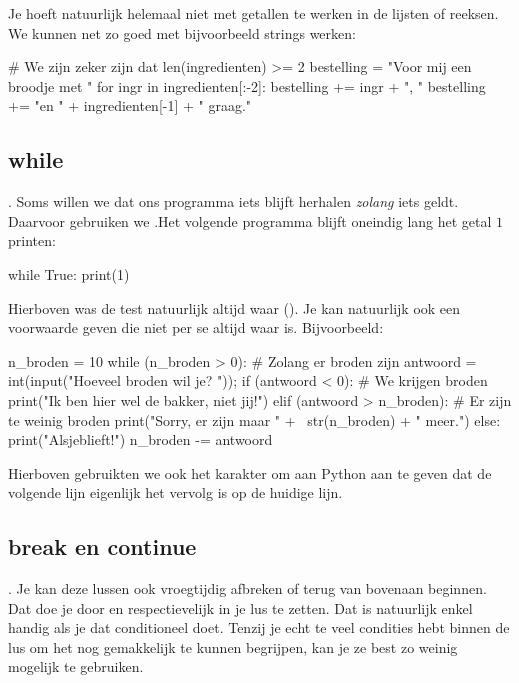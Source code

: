   Je hoeft natuurlijk helemaal niet met getallen te werken in de lijsten of
  reeksen. We kunnen net zo goed met bijvoorbeeld strings werken:
  \begin{python}
    # We zijn zeker zijn dat len(ingredienten) >= 2
    bestelling = "Voor mij een broodje met "
    for ingr in ingredienten[:-2]:
      bestelling += ingr + ", "
    bestelling += "en " + ingredienten[-1] + " graag."
  \end{python}

  \subsection{while}. Soms willen we dat ons programma iets blijft herhalen
  \emph{zolang} iets geldt. Daarvoor gebruiken we .Het volgende
  programma blijft oneindig lang het getal $1$ printen:
  \begin{python}
    while True:
      print(1)
  \end{python}
  Hierboven was de test natuurlijk altijd waar (). Je kan natuurlijk
  ook een voorwaarde geven die niet per se altijd waar is. Bijvoorbeeld:
  \begin{python}
    n_broden = 10
    while (n_broden > 0):         # Zolang er broden zijn
      antwoord = int(input("Hoeveel broden wil je? "));
      if (antwoord < 0):          # We krijgen broden
        print("Ik ben hier wel de bakker, niet jij!")
      elif (antwoord > n_broden): # Er zijn te weinig broden
        print("Sorry, er zijn maar " + \
          str(n_broden) + " meer.")
      else:
        print("Alsjeblieft!")
        n_broden -= antwoord
  \end{python}
  Hierboven gebruikten we ook het karakter \py{\textbackslash} om aan Python
  aan te geven dat de volgende lijn eigenlijk het vervolg is op de huidige
  lijn.

  \subsection{break en continue}. Je kan deze lussen ook vroegtijdig afbreken
  of terug van bovenaan beginnen. Dat doe je door \py{break} en \py{continue}
  respectievelijk in je lus te zetten. Dat is natuurlijk enkel handig als je dat
  conditioneel doet. Tenzij je echt te veel condities hebt binnen de lus om het
  nog gemakkelijk te kunnen begrijpen, kan je ze best zo weinig mogelijk te
  gebruiken.


